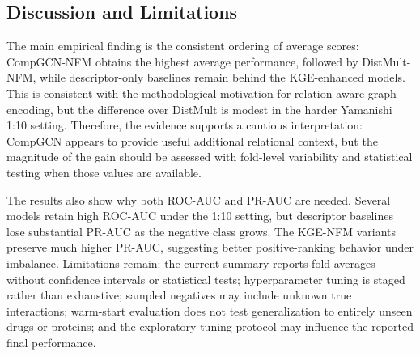 \subsection{Discussion and Limitations}

The main empirical finding is the consistent ordering of average scores: CompGCN-NFM obtains the highest average performance, followed by DistMult-NFM, while descriptor-only baselines remain behind the KGE-enhanced models. This is consistent with the methodological motivation for relation-aware graph encoding, but the difference over DistMult is modest in the harder Yamanishi 1:10 setting. Therefore, the evidence supports a cautious interpretation: CompGCN appears to provide useful additional relational context, but the magnitude of the gain should be assessed with fold-level variability and statistical testing when those values are available.

The results also show why both ROC-AUC and PR-AUC are needed. Several models retain high ROC-AUC under the 1:10 setting, but descriptor baselines lose substantial PR-AUC as the negative class grows. The KGE-NFM variants preserve much higher PR-AUC, suggesting better positive-ranking behavior under imbalance. Limitations remain: the current summary reports fold averages without confidence intervals or statistical tests; hyperparameter tuning is staged rather than exhaustive; sampled negatives may include unknown true interactions; warm-start evaluation does not test generalization to entirely unseen drugs or proteins; and the exploratory tuning protocol may influence the reported final performance.
